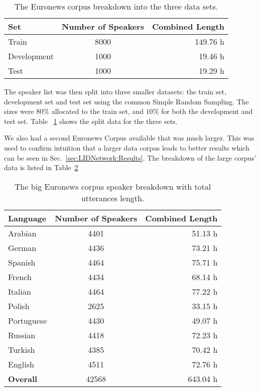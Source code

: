 \begin{table}[h!]
\label{tab:spkSplit}
\centering
\begin{tabular}{| l | c | r | }
	\hline
	\textbf{Set} & \textbf{Number of Speakers} & \textbf{Combined Length} \\
	\hline
	Train &  8000 & 149.76 h \\
	Development & 1000 & 19.46 h \\
	Test & 1000 & 19.29 h \\
	\hline
\end{tabular}
\caption{The Euronews corpus breakdown into the three data sets.}
\end{table}

The speaker list was then split into three smaller datasets: the train set, development set and test set using the common Simple Random Sampling. The sizes were \(80\%\) allocated to the train set, and \(10\%\) for both the development and test set. Table ~\ref{tab:spkSplit} shows the split data for the three sets. 

We also had a second Euronews Corpus available that was much larger. This was used to confirm intuition that a larger data corpus leads to better results which can be seen in Sec.~\ref{sec:LIDNetwork:Results}. The breakdown of the large corpus' data is listed in Table~\ref{tab:spkDataBig}

\begin{table}[h!]
\label{tab:spkDataBig}
\centering
\begin{tabular}{| l | c | r | }
	\hline
	\textbf{Language} & \textbf{Number of Speakers} & \textbf{Combined Length} \\
	\hline
	Arabian & 4401 & 51.13 h \\
	German & 4436 & 73.21 h \\
	Spanish & 4464 & 75.71 h \\
	French & 4434 & 68.14 h \\  
	Italian & 4464 & 77.22 h \\  
	Polish & 2625 & 33.15 h \\ 
	Portuguese & 4430 & 49.07 h \\ 
	Russian & 4418 & 72.23 h \\ 
	Turkish & 4385 & 70.42 h \\  
	English & 4511 & 72.76 h \\ 
	\hline
	\textbf{Overall} & 42568 & 643.04 h\\
	\hline
	
\end{tabular}
\caption{The big Euronews corpus speaker breakdown with total utterances length.}
\end{table}


